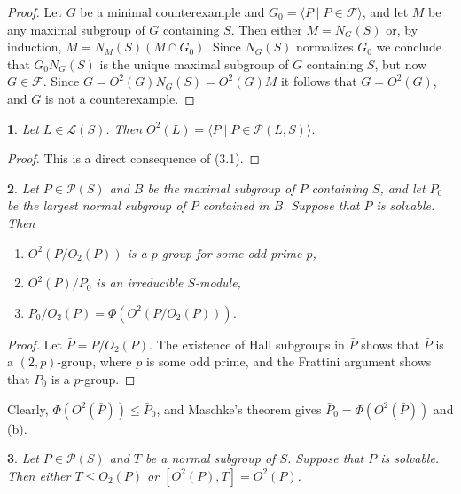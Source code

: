 \documentclass[11pt]{article}
\theoremstyle{plain}
\theoremstyle{stmplain}
\newtheorem{stm}{}[section]
\begin{document}
\begin{proof}
Let $G$ be a minimal counterexample and $G_0 = \langle P \mid P \in
\mathcal{F} \rangle$, and let $M$ be any maximal subgroup of $G$ containing
$S$. Then either $M = N_G(S)$ or, by induction, $M = N_M(S)(M \cap G_0)$.
Since $N_G(S)$ normalizes $G_0$ we conclude that $G_0N_G(S)$ is the unique
maximal subgroup of $G$ containing $S$, but now $G \in \mathcal{F}$. Since $G =
O^2(G)N_G(S) = O^2(G)M$ it follows that $G = O^2(G)$, and $G$ is not a
counterexample.
\end{proof}

\begin{stm}\label{st:3.2}
Let $L \in \mathcal{L}(S)$. Then $O^2(L) = \langle P \mid P \in
\mathcal{P}(L, S) \rangle$.
\end{stm}

\begin{proof}
This is a direct consequence of (3.1).
\end{proof}

\begin{stm}\label{st:3.3}
Let $P \in \mathcal{P}(S)$ and $B$ be the maximal subgroup of $P$ containing
$S$, and let $P_0$ be the largest normal subgroup of $P$ contained in $B$.
Suppose that $P$ is solvable. Then
\begin{enumerate}
\item[(a)] $O^2(P/O_2(P))$ is a $p$-group for some odd prime $p$,
\item[(b)] $O^2(P)/P_0$ is an irreducible $S$-module,
\item[(c)] $P_0/O_2(P) = \Phi(O^2(P/O_2(P)))$.
\end{enumerate}
\end{stm}

\begin{proof}
Let $\bar{P} = P/O_2(P)$. The existence of Hall subgroups in $\bar{P}$ shows
that $\bar{P}$ is a $(2, p)$-group, where $p$ is some odd prime, and the
Frattini argument shows that $P_0$ is a $p$-group.
\end{proof}

\noindent Clearly, $\Phi(O^2(\bar{P})) \le \bar{P}_0$, and Maschke's theorem gives
$\bar{P}_0 = \Phi(O^2(\bar{P}))$ and (b).

\begin{stm}\label{st:3.4}
Let $P \in \mathcal{P}(S)$ and $T$ be a normal subgroup of $S$. Suppose that $P$
is solvable. Then either $T \le O_2(P)$ or $[O^2(P), T] = O^2(P)$.
\end{stm}
\end{document}
